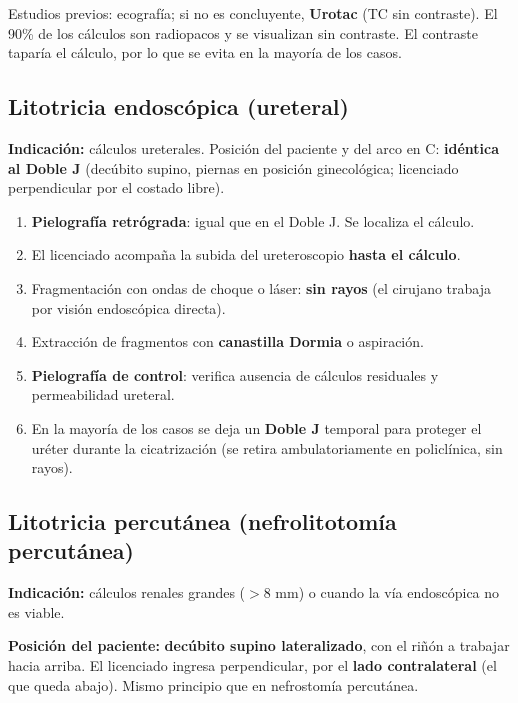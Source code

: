 {Estudios previos: ecografía; si no es concluyente, \textbf{Urotac} (TC sin contraste). El 90\% de los cálculos son radiopacos y se visualizan sin contraste. El contraste taparía el cálculo, por lo que se evita en la mayoría de los casos.

\subsection*{Litotricia endoscópica (ureteral)}

\textbf{Indicación:} cálculos ureterales. Posición del paciente y del arco en C: \textbf{idéntica al Doble J} (decúbito supino, piernas en posición ginecológica; licenciado perpendicular por el costado libre).

\begin{enumerate}[noitemsep]
  \item \textbf{Pielografía retrógrada}: igual que en el Doble J. Se localiza el cálculo.
  \item El licenciado acompaña la subida del ureteroscopio \textbf{hasta el cálculo}.
  \item Fragmentación con ondas de choque o láser: \textbf{sin rayos} (el cirujano trabaja por visión endoscópica directa).
  \item Extracción de fragmentos con \textbf{canastilla Dormia} o aspiración.
  \item \textbf{Pielografía de control}: verifica ausencia de cálculos residuales y permeabilidad ureteral.
  \item En la mayoría de los casos se deja un \textbf{Doble J} temporal para proteger el uréter durante la cicatrización (se retira ambulatoriamente en policlínica, sin rayos).
\end{enumerate}

\subsection*{Litotricia percutánea (nefrolitotomía percutánea)}

\textbf{Indicación:} cálculos renales grandes ($>$8 mm) o cuando la vía endoscópica no es viable.

\textbf{Posición del paciente:} \textbf{decúbito supino lateralizado}, con el riñón a trabajar hacia arriba. El licenciado ingresa perpendicular, por el \textbf{lado contralateral} (el que queda abajo). Mismo principio que en nefrostomía percutánea.

}
